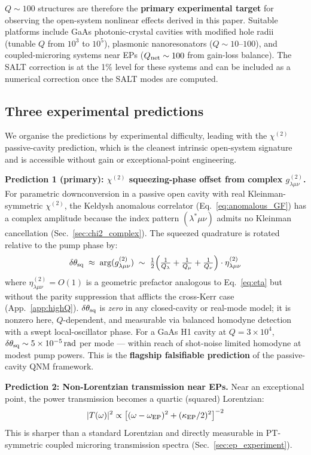 \documentclass[12pt]{article}
\newcommand{\EP}{{\rm EP}}
\begin{document}
$Q\sim 100$ structures are therefore the \textbf{primary experimental
target} for observing the open-system nonlinear effects derived in this
paper.  Suitable platforms include GaAs photonic-crystal cavities with
modified hole radii (tunable $Q$ from $10^3$ to $10^5$), plasmonic
nanoresonators ($Q\sim 10$--$100$), and coupled-microring systems near
EPs ($Q_{\rm net}\sim 100$ from gain-loss balance).  The SALT correction
is at the 1\% level for these systems and can be included as a numerical
correction once the SALT modes are computed.

\subsection{Three experimental predictions}

We organise the predictions by experimental difficulty, leading with
the $\chi^{(2)}$ passive-cavity prediction, which is the cleanest
intrinsic open-system signature and is accessible without gain or
exceptional-point engineering.

\textbf{Prediction 1 (primary): $\chi^{(2)}$ squeezing-phase offset
from complex $g^{(2)}_{\lambda\mu\nu}$.}
For parametric downconversion in a passive open cavity with real
Kleinman-symmetric $\chi^{(2)}$, the Keldysh anomalous correlator
(Eq.~\ref{eq:anomalous_GF}) has a complex amplitude because the index
pattern $(\lambda^*\mu\nu)$ admits no Kleinman cancellation
(Sec.~\ref{sec:chi2_complex}).  The squeezed quadrature is rotated
relative to the pump phase by:
\begin{equation}
  \delta\theta_{\rm sq}\;\approx\;\arg(g^{(2)}_{\lambda\mu\nu})
  \;\sim\;\tfrac{1}{2}\!\left(\tfrac{1}{Q_\lambda}+\tfrac{1}{Q_\mu}
  +\tfrac{1}{Q_\nu}\right)\cdot\eta^{(2)}_{\lambda\mu\nu}
  \label{eq:prediction1}
\end{equation}
where $\eta^{(2)}_{\lambda\mu\nu}=O(1)$ is a geometric prefactor
analogous to Eq.~\eqref{eq:eta} but without the parity suppression
that afflicts the cross-Kerr case (App.~\ref{app:highQ}).
$\delta\theta_{\rm sq}$ is \emph{zero} in any closed-cavity or
real-mode model; it is nonzero here, $Q$-dependent, and measurable via
balanced homodyne detection with a swept local-oscillator phase.  For
a GaAs H1 cavity at $Q=3\times 10^4$, $\delta\theta_{\rm sq}\sim
5\times 10^{-5}\,\mathrm{rad}$ per mode --- within reach of shot-noise
limited homodyne at modest pump powers.  This is the
\textbf{flagship falsifiable prediction} of the passive-cavity QNM
framework.

\textbf{Prediction 2: Non-Lorentzian transmission near EPs.}
Near an exceptional point, the power transmission becomes a quartic
(squared) Lorentzian:
\begin{equation}
  |T(\omega)|^2\propto
  \bigl[(\omega-\omega_\EP)^2+(\kappa_\EP/2)^2\bigr]^{-2}
  \label{eq:prediction2}
\end{equation}
This is sharper than a standard Lorentzian and directly measurable in
PT-symmetric coupled microring transmission spectra
(Sec.~\ref{sec:ep_experiment}).
\end{document}
